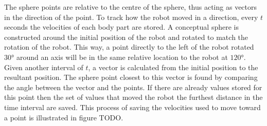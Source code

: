 \documentclass{article}
\begin{document}
The sphere points are relative to the centre of the sphere, thus acting as vectors in the direction of the point. To track how the robot moved in a direction, every $t$ seconds the velocities of each body part are stored. A conceptual sphere is constructed around the initial position of the robot and rotated to match the rotation of the robot. This way, a point directly to the left of the robot rotated $30°$ around an axis will be in the same relative location to the robot at $120°$. \\
Given another interval of $t$, a vector is calculated from the initial position to the resultant position. The sphere point closest to this vector is found by comparing the angle between the vector and the points. 
If there are already values stored for this point then the set of values that moved the robot the furthest distance in the time interval are saved. This process of saving the velocities used to move toward a point is illustrated in figure TODO. 
\end{document}
